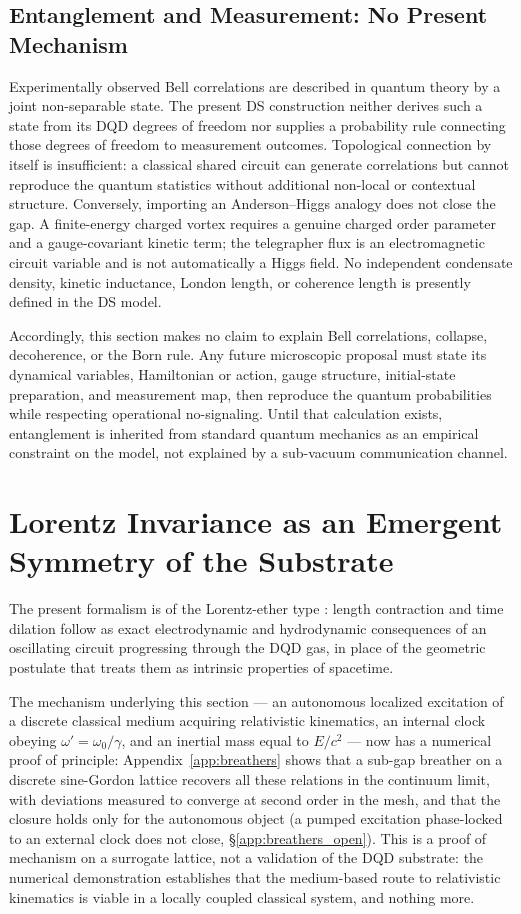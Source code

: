 \documentclass[11pt,a4paper]{article}
\theoremstyle{plain}
\theoremstyle{remark}
\begin{document}
\subsection{Entanglement and Measurement: No Present Mechanism}
Experimentally observed Bell correlations are described in quantum theory by a joint non-separable state. The present DS construction neither derives such a state from its DQD degrees of freedom nor supplies a probability rule connecting those degrees of freedom to measurement outcomes. Topological connection by itself is insufficient: a classical shared circuit can generate correlations but cannot reproduce the quantum statistics without additional non-local or contextual structure. Conversely, importing an Anderson--Higgs analogy does not close the gap. A finite-energy charged vortex requires a genuine charged order parameter and a gauge-covariant kinetic term; the telegrapher flux is an electromagnetic circuit variable and is not automatically a Higgs field. No independent condensate density, kinetic inductance, London length, or coherence length is presently defined in the DS model.

Accordingly, this section makes no claim to explain Bell correlations, collapse, decoherence, or the Born rule. Any future microscopic proposal must state its dynamical variables, Hamiltonian or action, gauge structure, initial-state preparation, and measurement map, then reproduce the quantum probabilities while respecting operational no-signaling. Until that calculation exists, entanglement is inherited from standard quantum mechanics as an empirical constraint on the model, not explained by a sub-vacuum communication channel.

\section{Lorentz Invariance as an Emergent Symmetry of the Substrate}
\label{sec:lorentz}

The present formalism is of the Lorentz-ether type \cite{einstein1920}: length contraction and time dilation follow as exact electrodynamic and hydrodynamic consequences of an oscillating circuit progressing through the DQD gas, in place of the geometric postulate that treats them as intrinsic properties of spacetime.

The mechanism underlying this section --- an autonomous localized excitation of a discrete classical medium acquiring relativistic kinematics, an internal clock obeying $\omega' = \omega_0/\gamma$, and an inertial mass equal to $E/c^2$ --- now has a numerical proof of principle: Appendix~\ref{app:breathers} shows that a sub-gap breather on a discrete sine-Gordon lattice recovers all these relations in the continuum limit, with deviations measured to converge at second order in the mesh, and that the closure holds only for the autonomous object (a pumped excitation phase-locked to an external clock does not close, \S\ref{app:breathers_open}). This is a proof of mechanism on a surrogate lattice, not a validation of the DQD substrate: the numerical demonstration establishes that the medium-based route to relativistic kinematics is viable in a locally coupled classical system, and nothing more.
\end{document}
